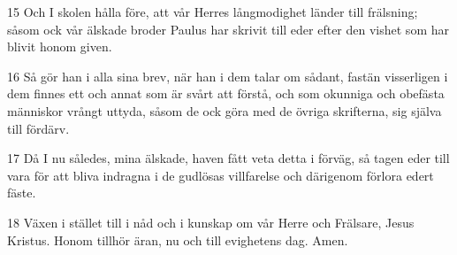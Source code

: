 \par 15 Och I skolen hålla före, att vår Herres långmodighet länder till frälsning; såsom ock vår älskade broder Paulus har skrivit till eder efter den vishet som har blivit honom given.
\par 16 Så gör han i alla sina brev, när han i dem talar om sådant, fastän visserligen i dem finnes ett och annat som är svårt att förstå, och som okunniga och obefästa människor vrångt uttyda, såsom de ock göra med de övriga skrifterna, sig själva till fördärv.
\par 17 Då I nu således, mina älskade, haven fått veta detta i förväg, så tagen eder till vara för att bliva indragna i de gudlösas villfarelse och därigenom förlora edert fäste.
\par 18 Växen i stället till i nåd och i kunskap om vår Herre och Frälsare, Jesus Kristus. Honom tillhör äran, nu och till evighetens dag. Amen.


